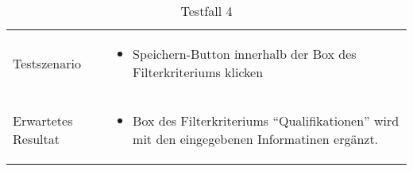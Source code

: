 \newpage
\newpage

\begin{table}[h!]
   \begin{tabular}{|L{0.4\textwidth}|L{0.6\textwidth}|}
        \\[12pt]
      \hline
      Testszenario & 
      \begin{itemize}
         \item Speichern-Button innerhalb der Box des Filterkriteriums klicken
      \end{itemize} \\
       \hline
       Erwartetes Resultat & 
       \begin{itemize}
         \item Box des Filterkriteriums ``Qualifikationen'' wird mit den eingegebenen Informatinen ergänzt.
      \end{itemize} \\
      \hline
     \end{tabular}
     \caption{Testfall 4}
\end{table}

\newpage

